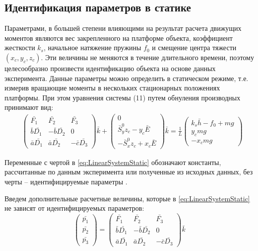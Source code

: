 \subsection{Идентификация параметров в статике}
Параметрами, в большей степени влияющими на результат расчета движущих моментов являются вес закрепленного на платформе объекта, коэффициент жесткости $k_s$, начальное натяжение пружины $f_0$ и смещение центра тяжести $(x_c, y_c, z_c)$. Эти величины не меняются в течение длительного времени, поэтому целесообразно произвести идентификацию объекта на основе данных эксперимента.
	Данные параметры можно определить в статическом режиме, т.е. измерив вращающие моменты в нескольких стационарных положениях платформы. При этом уравнения системы (11) путем обнуления производных принимают вид:
\begin{equation}
\label{eq:LinearSystemStatic}
\begin{aligned}
& \begin{pmatrix}
\bar{F_1} & \bar{F_2} & \bar{F_3} \\
\bar{b}\bar{D_1} & -\bar{b}\bar{D_2} & 0 \\
\bar{a}\bar{D_1} & \bar{a}\bar{D_2} & -\bar{c}\bar{D_3}
\end{pmatrix}\bar{k} +
\begin{pmatrix}0 \\ \bar{S}_y^0z_c -y_c\bar{E} \\ -\bar{S}_x^0z_c+x_c\bar{E}\end{pmatrix}\bar{k} = \frac{1}{L}
\begin{pmatrix}
k_s\bar{h} - f_0 + mg \\
y_cmg \\-x_cmg
\end{pmatrix}
\end{aligned}
\end{equation}

Переменные с чертой в \ref{eq:LinearSystemStatic} обозначают константы, рассчитанные по данным эксперимента или полученные из исходных данных, без черты – идентифицируемые параметры \cite{Graupe}.

Введем дополнительные расчетные величины, которые в \ref{eq:LinearSystemStatic} не зависят от идентифицируемых параметров:
\begin{equation}
\label{eq:AdditionalEstimatedVariables}
\begin{pmatrix}
\bar{p_1} \\ \bar{p_2} \\ \bar{p_3}
\end{pmatrix} =
\begin{pmatrix}
\bar{F_1} & \bar{F_2} & \bar{F_3} \\
\bar{b}\bar{D_1} & -\bar{b}\bar{D_2} & 0 \\
\bar{a}\bar{D_1} & \bar{a}\bar{D_2} & -\bar{c}\bar{D_3}
\end{pmatrix}\bar{k}
\end{equation}

